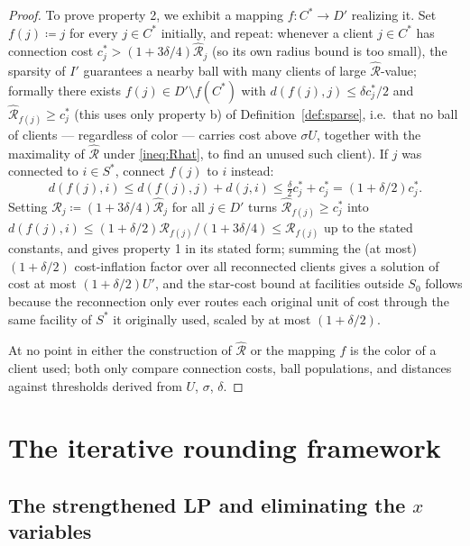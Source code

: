 \documentclass[a4paper,11pt]{article}
\begin{document}
\begin{proof}
To prove property 2, we exhibit a mapping $f:C^*\to D'$ realizing it. Set
$f(j)\coloneqq j$ for every $j\in C^*$ initially, and repeat: whenever a
client $j\in C^*$ has connection cost $c_j^*>(1+3\delta/4)\hat{\mathcal{R}}_j$ (so
its own radius bound is too small), the sparsity of $I'$ guarantees a
nearby ball with many clients of large $\hat{\mathcal{R}}$-value; formally there
exists $f(j)\in D'\setminus f(C^*)$ with $d(f(j),j)\le \delta c_j^*/2$
and $\hat{\mathcal{R}}_{f(j)}\ge c_j^*$ (this uses only property b) of
Definition~\ref{def:sparse}, i.e.\ that no ball of clients — regardless
of color — carries cost above $\sigma U$, together with the maximality
of $\hat{\mathcal{R}}$ under \eqref{ineq:Rhat}, to find an unused such client). If
$j$ was connected to $i\in S^*$, connect $f(j)$ to $i$ instead:
\[
d(f(j),i) \le d(f(j),j) + d(j,i) \le \tfrac{\delta}{2}c_j^* + c_j^* =
(1+\delta/2)c_j^*.
\]
Setting $\mathcal{R}_j \coloneqq (1+3\delta/4)\hat{\mathcal{R}}_j$ for all $j\in D'$ turns
$\hat{\mathcal{R}}_{f(j)}\ge c_j^*$ into $d(f(j),i)\le (1+\delta/2)\mathcal{R}_{f(j)}/(1+3\delta/4)
\le \mathcal{R}_{f(j)}$ up to the stated constants, and gives property 1 in its
stated form; summing the (at most) $(1+\delta/2)$ cost-inflation factor
over all reconnected clients gives a solution of cost at most
$(1+\delta/2)U'$, and the star-cost bound at facilities outside $S_0$
follows because the reconnection only ever routes each original unit of
cost through the same facility of $S^*$ it originally used, scaled by at
most $(1+\delta/2)$.

At no point in either the construction of $\hat{\mathcal{R}}$ or the mapping $f$ is
the color of a client used; both only compare connection costs, ball
populations, and distances against thresholds derived from $U$, $\sigma$,
$\delta$.
\end{proof}

\section{The iterative rounding framework}

\subsection{The strengthened LP and eliminating the $x$ variables}
\end{document}
